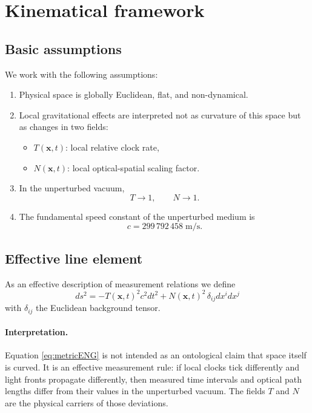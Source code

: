 \documentclass[11pt,a4paper]{article}
\begin{document}
\section{Kinematical framework}
\subsection{Basic assumptions}
We work with the following assumptions:
\begin{enumerate}[label=\arabic*.]
    \item Physical space is globally Euclidean, flat, and non-dynamical.
    \item Local gravitational effects are interpreted not as curvature of this space but as changes in two fields:
    \begin{itemize}
        \item $T(\mathbf{x},t)$: local relative clock rate,
        \item $N(\mathbf{x},t)$: local optical-spatial scaling factor.
    \end{itemize}
    \item In the unperturbed vacuum,
    \begin{equation}
      T \to 1, \qquad N \to 1.
    \end{equation}
    \item The fundamental speed constant of the unperturbed medium is
    \begin{equation}
      c = 299\,792\,458\;\mathrm{m/s}.
    \end{equation}
\end{enumerate}

\subsection{Effective line element}
As an effective description of measurement relations we define
\begin{equation}
\boxed{
 ds^2 = -T(\mathbf{x},t)^2 c^2 dt^2 + N(\mathbf{x},t)^2\,\delta_{ij}dx^i dx^j
}
\label{eq:metricENG}
\end{equation}
with $\delta_{ij}$ the Euclidean background tensor.

\paragraph{Interpretation.}
Equation \eqref{eq:metricENG} is not intended as an ontological claim that space itself is curved. It is an effective measurement rule: if local clocks tick differently and light fronts propagate differently, then measured time intervals and optical path lengths differ from their values in the unperturbed vacuum. The fields $T$ and $N$ are the physical carriers of those deviations.
\end{document}
